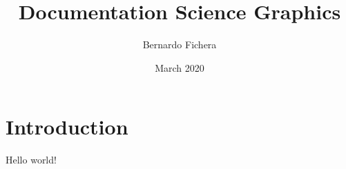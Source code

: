 \documentclass[12pt]{article}
\title{Documentation Science Graphics}
\author{Bernardo Fichera}
\date{March 2020}
\begin{document}
\maketitle

\section*{Introduction}

Hello world!
\end{document}
